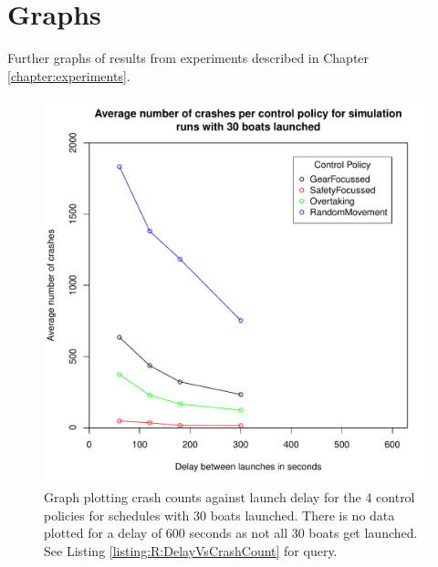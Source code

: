 \chapter{Graphs} \label{appendix:graphs}
Further graphs of results from experiments described in Chapter \ref{chapter:experiments}.

\begin{figure}[hb]
\begin{center}
  \includegraphics[scale=0.8]{"images/graphs/Average number of crashes per control policy for simulation runs with 30 boats launched"}
  \caption{Graph plotting crash counts against launch delay for the 4 control policies for schedules with 30 boats launched. There is no data plotted for a delay of 600 seconds as not all 30 boats get launched. See Listing \ref{listing:R:DelayVsCrashCount} for query.}
  \label{appendix:graphs:crash_counts_30_launches}
\end{center}
\end{figure}

